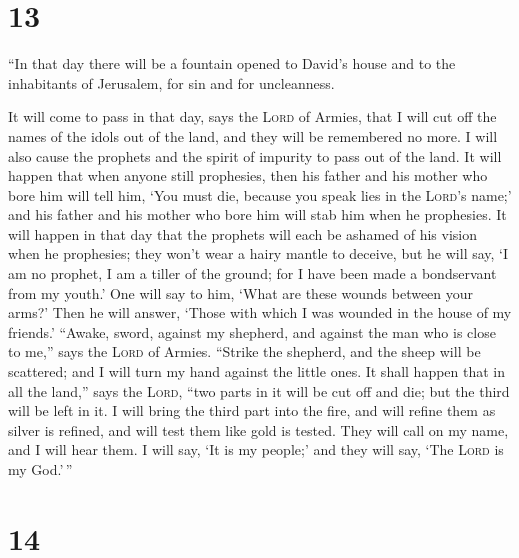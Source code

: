 \hypertarget{section-12}{%
\section{13}\label{section-12}}

 ``In that day there will be a fountain opened to David's
house and to the inhabitants of Jerusalem, for sin and for uncleanness.

 It will come to pass in that day, says the \textsc{Lord}
of Armies, that I will cut off the names of the idols out of the land,
and they will be remembered no more. I will also cause the prophets and
the spirit of impurity to pass out of the land.  It will
happen that when anyone still prophesies, then his father and his mother
who bore him will tell him, `You must die, because you speak lies in the
\textsc{Lord}'s name;' and his father and his mother who bore him will
stab him when he prophesies.  It will happen in that day
that the prophets will each be ashamed of his vision when he prophesies;
they won't wear a hairy mantle to deceive,  but he will
say, `I am no prophet, I am a tiller of the ground; for I have been made
a bondservant from my youth.'  One will say to him, `What
are these wounds between your arms?' Then he will answer, `Those with
which I was wounded in the house of my friends.'  ``Awake,
sword, against my shepherd, and against the man who is close to me,''
says the \textsc{Lord} of Armies. ``Strike the shepherd, and the sheep
will be scattered; and I will turn my hand against the little ones.
 It shall happen that in all the land,'' says the
\textsc{Lord}, ``two parts in it will be cut off and die; but the third
will be left in it.  I will bring the third part into the
fire, and will refine them as silver is refined, and will test them like
gold is tested. They will call on my name, and I will hear them. I will
say, `It is my people;' and they will say, `The \textsc{Lord} is my
God.'\,''

\hypertarget{section-13}{%
\section{14}\label{section-13}}

